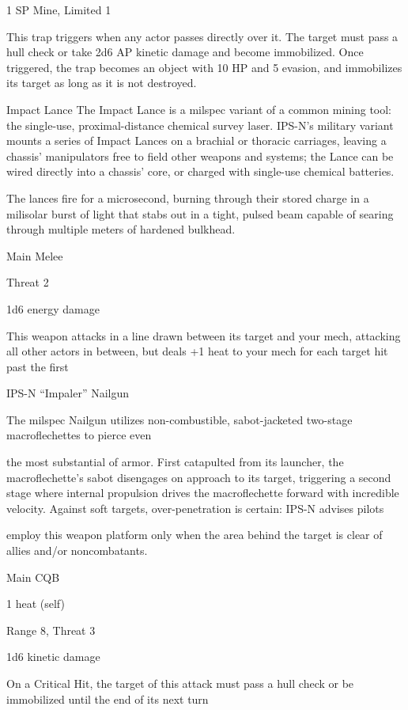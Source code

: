                                                                                                                   


1 SP  
Mine, Limited 1  

This trap triggers when any actor passes directly over it. The target must pass a hull check or  
take 2d6 AP kinetic damage and become immobilized. Once triggered, the trap becomes an  
object with 10 HP and 5 evasion, and immobilizes its target as long as it is not destroyed.
 

Impact Lance  
The Impact Lance is a milspec variant of a common mining tool: the single-use, proximal-distance chemical  
survey laser. IPS-N’s military variant mounts a series of Impact Lances on a brachial or thoracic carriages,  
leaving a chassis’ manipulators free to field other weapons and systems; the Lance can be wired directly  
into a chassis’ core, or charged with single-use chemical batteries.   

The lances fire for a microsecond, burning through their stored charge in a milisolar burst of light that stabs  
out in a tight, pulsed beam capable of searing through multiple meters of hardened bulkhead.  

Main Melee
 
Threat 2
 
1d6 energy damage
 
This weapon attacks in a line drawn between its target and your mech, attacking all other actors  
in between, but deals +1 heat to your mech for each target hit past the first
 

IPS-N “Impaler” Nailgun  

The milspec Nailgun utilizes non-combustible, sabot-jacketed two-stage macroflechettes to pierce even  

the most substantial of armor. First catapulted from its launcher, the macroflechette’s sabot disengages on  
approach to its target, triggering a second stage where internal propulsion drives the macroflechette  
forward with incredible velocity. Against soft targets, over-penetration is certain: IPS-N advises pilots  

employ this weapon platform only when the area behind the target is clear of allies and/or noncombatants.   

Main CQB
 
1 heat (self)
 
Range 8, Threat 3
 
1d6 kinetic damage
 
On a Critical Hit, the target of this attack must pass a hull check or be immobilized until the end  
of its next turn
 

